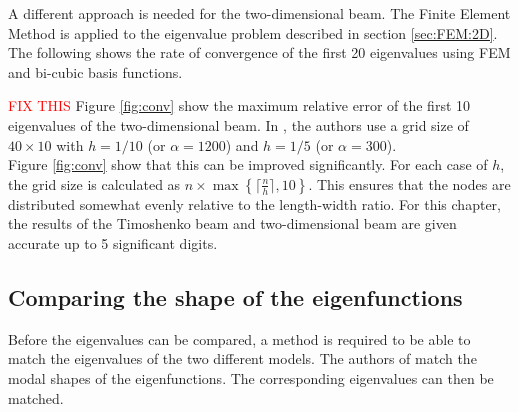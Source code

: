 \documentclass[../../main.tex]{subfiles}
\begin{document}
A different approach is needed for the two-dimensional beam. The Finite Element Method is applied to the eigenvalue problem described in section \ref{sec:FEM:2D}. The following shows the rate of convergence of the first 20 eigenvalues using FEM and bi-cubic basis functions.

\begin{figure}[H]
	\begin{center}
	\end{center}	
\end{figure}
\textcolor{red}{FIX THIS}
Figure \ref{fig:conv} show the maximum relative error of the first 10 eigenvalues of the two-dimensional beam. In \cite{LVV09}, the authors use a grid size of $40 \times 10$ with $h= 1/10$ (or $\alpha = 1200$) and $h = 1/5$ (or $\alpha = 300$).\\

 Figure \ref{fig:conv} show that this can be improved significantly. For each case of $h$, the grid size is calculated as $n \times \max\left\{\lceil\frac{n}{h}\rceil,10\right\}$. This ensures that the nodes are distributed somewhat evenly relative to the length-width ratio. For this chapter, the results of the Timoshenko beam and two-dimensional beam are given accurate up to 5 significant digits.

\subsection{Comparing the shape of the eigenfunctions}
Before the eigenvalues can be compared, a method is required to be able to match the eigenvalues of the two different models. The authors of \cite{LVV09} match the modal shapes of the eigenfunctions. The corresponding eigenvalues can then be matched.\\
\end{document}
